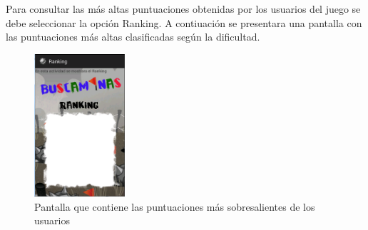 \documentclass[11pt]{article} %
\begin{document}
\newpage
\thispagestyle{empty}

Para consultar las m\'as altas puntuaciones obtenidas por los usuarios del juego se debe seleccionar la opci\'on Ranking. A contiuaci\'on se presentara una pantalla con las puntuaciones m\'as altas clasificadas seg\'un la dificultad.
\begin{center}

	\begin{figure}[h!]
  		\centering
    		\includegraphics[width=0.3\textwidth]{imagenes/Ranking.PNG}
  		\caption{Pantalla que contiene las puntuaciones  m\'as sobresalientes de los usuarios}
		\label{fig:ranking}
	\end{figure}
\end{center}

\newpage
\thispagestyle{empty}
\end{document}
